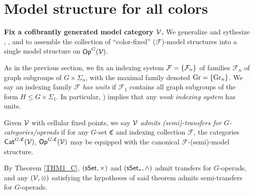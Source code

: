 \documentclass[a4paper,10pt
]{article}%
\renewcommand{\F}{\mathcal F}
\renewcommand{\1}{\ensuremath{\mathbb{id}}}
\begin{document}
\newpage

\section{Model structure for all colors} 
\renewcommand{\C}{\mathfrak C}

\textbf{Fix a cofibrantly generated model category $\mathcal V$.}
We generalize and sythesize \cite{BM13}, \cite{Cav14}, and \cite{CM13b} to assemble the collection of
``color-fixed'' ($\F$)-model structures into a single model structure on $\mathsf{Op}^G(\mathcal V)$.




As in the previous section, we fix an indexing system $\F = \set{\F_n}$ of families $\F_n$ of graph subgroups of $G \times \Sigma_n$,
with the maximal family denoted $\mathrm{Gr} = \left\{\mathrm{Gr}_n\right\}$.
We say an indexing family $\F$ \textit{has units} if
$\F_1$ contains all graph subgroups of the form $H \leq G \times \Sigma_1$.
In particular, \cite[Remark 4.50]{BP17}) implies that any \textit{weak indexing system} has units.

\begin{definition}
      Given $\mathcal V$ with cellular fixed points, we say
      $\mathcal V$ \textit{admits (semi)-transfers for $G$-categories/operads} if
      for any $G$-set $\mathfrak C$ and indexing collection $\F$,
      the categories $\mathsf{Cat}^{G, \mathfrak C}(\mathcal V)$, $\mathsf{Op}^{G, \mathfrak C}(\mathcal V)$
      may be equipped with the canonical $\F$-(semi)-model structure.
\end{definition}

\begin{example}
      By Theorem \ref{THM1_C}, $(\mathsf{sSet}, \times)$ and $(\sSet_{\**}, \wedge)$ admit transfers for $G$-operads,
      and any $(\mathcal V, \otimes)$ satisfying the hypotheses of said theorem admits semi-transfers for $G$-operads.
\end{example}
\end{document}
